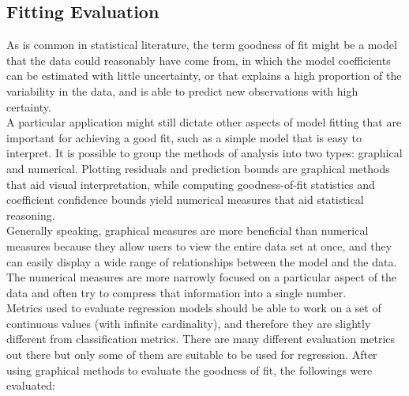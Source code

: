 \subsection{Fitting Evaluation}
\label{sec:fiteval}
As is common in statistical literature, the term goodness of fit might be a model that the data could reasonably have come from, in which the model coefficients can be estimated with little uncertainty, or that explains a high proportion of the variability in the data, and is able to predict new observations with high certainty. \\

\noindent A particular application might still dictate other aspects of model fitting that are important for achieving a good fit, such as a simple model that is easy to interpret. It is possible to group the methods of analysis \cite[]{Evaluati10:online} into two types: graphical and numerical. Plotting residuals and prediction bounds are graphical methods that aid visual interpretation, while computing goodness-of-fit statistics and coefficient confidence bounds yield numerical measures that aid statistical reasoning.\\

\noindent Generally speaking, graphical measures are more beneficial than numerical measures because they allow users to view the entire data set at once, and they can easily display a wide range of relationships between the model and the data. The numerical measures are more narrowly focused on a particular aspect of the data and often try to compress that information into a single number. \\

\noindent Metrics used to evaluate regression models should be able to work on a set of continuous values (with infinite cardinality), and therefore they are slightly different from classification metrics. There are many different evaluation metrics out there but only some of them are suitable to be used for regression. After using graphical methods to evaluate the goodness of fit, the followings were evaluated:

